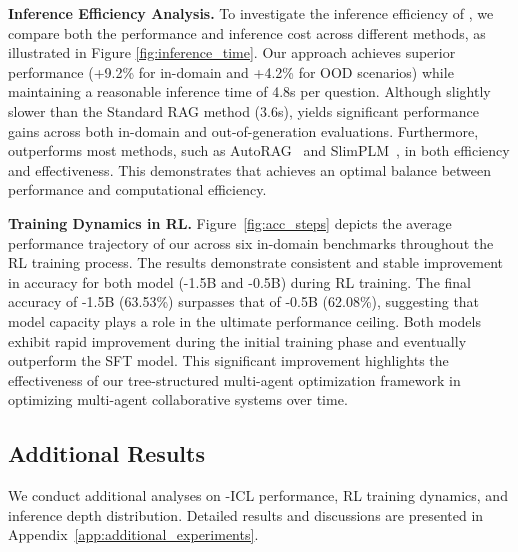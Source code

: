 
\textbf{Inference Efficiency Analysis.}
To investigate the inference efficiency of \modelname, we compare both the performance and inference cost across different methods, as illustrated in Figure \ref{fig:inference_time}.
Our approach achieves superior performance (+9.2\% for in-domain and +4.2\% for OOD scenarios) while maintaining a reasonable inference time of 4.8s per question.
Although slightly slower than the Standard RAG method (3.6s), \modelname yields significant performance gains across both in-domain and out-of-generation evaluations.
Furthermore, \modelname outperforms most methods, such as AutoRAG~\citep{auto-rag} and SlimPLM~\citep{TanD0GFW24}, in both efficiency and effectiveness.
This demonstrates that \modelname achieves an optimal balance between performance and computational efficiency.

\textbf{Training Dynamics in RL.}
Figure~\ref{fig:acc_steps} depicts the average performance trajectory of our \modelname across six in-domain benchmarks throughout the RL training process.
The results demonstrate consistent and stable improvement in accuracy for both model (\modelname-1.5B and \modelname-0.5B) during RL training. 
The final accuracy of \modelname-1.5B (63.53\%) surpasses that of \modelname-0.5B (62.08\%), suggesting that model capacity plays a role in the ultimate performance ceiling.
Both models exhibit rapid improvement during the initial training phase and eventually outperform the SFT model.
This significant improvement highlights the effectiveness of our tree-structured multi-agent optimization framework in optimizing multi-agent collaborative systems over time.


\subsection{Additional Results}
We conduct additional analyses on \modelname-ICL performance, RL training dynamics, and inference depth distribution.
Detailed results and discussions are presented in Appendix~\ref{app:additional_experiments}.
